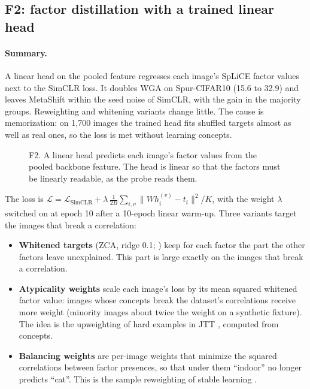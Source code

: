 \documentclass[11pt]{article}
\newcommand{\summary}{\paragraph{Summary.}}
\begin{document}
\subsection{F2: factor distillation with a trained linear head}
\summary A linear head on the pooled feature regresses each image's SpLiCE factor values next to the SimCLR
loss. It doubles WGA on Spur-CIFAR10 (15.6 to 32.9) and leaves MetaShift within the seed noise of SimCLR, with
the gain in the majority groups. Reweighting and whitening variants change little. The cause is memorization:
on 1,700 images the trained head fits shuffled targets almost as well as real ones, so the loss is met without
learning concepts.

\begin{figure}[H]
\centering
{}
\caption{F2. A linear head predicts each image's factor values from the pooled backbone feature. The head is
linear so that the factors must be linearly readable, as the probe reads them.}
\end{figure}
The loss is $\mathcal L=\mathcal L_{\text{SimCLR}}+\lambda\,\frac{1}{2B}\sum_{i,v}\lVert W h_i^{(v)}-t_i\rVert^2/K$,
with the weight $\lambda$ switched on at epoch 10 after a 10-epoch linear warm-up. Three variants target the
images that break a correlation:
\begin{itemize}[leftmargin=*]
\item \textbf{Whitened targets} (ZCA, ridge 0.1; \citealp{kessy2018whitening}) keep for each factor the part the
other factors leave unexplained. This part is large exactly on the images that break a correlation.
\item \textbf{Atypicality weights} scale each image's loss by its mean squared whitened factor value: images
whose concepts break the dataset's correlations receive more weight (minority images about twice the weight on
a synthetic fixture). The idea is the upweighting of hard examples in JTT \citep{liu2021jtt}, computed from
concepts.
\item \textbf{Balancing weights} are per-image weights that minimize the squared correlations between factor
presences, so that under them ``indoor'' no longer predicts ``cat''. This is the sample reweighting of stable
learning \citep{shen2020stable,zhang2021deepstable}.
\end{itemize}
\end{document}
